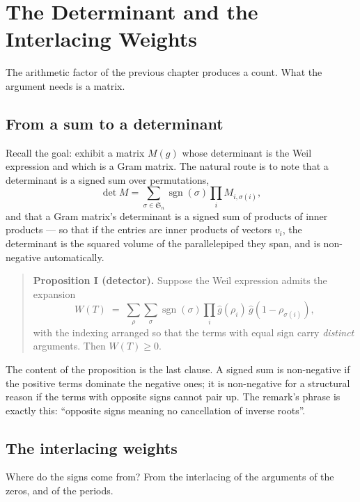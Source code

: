 
\chapter{The Determinant and the Interlacing Weights}
\label{ch:determinant}

The arithmetic factor of the previous chapter produces a count. What the
argument needs is a matrix.

\section{From a sum to a determinant}Recall the goal: exhibit a matrix $M(g)$ whose determinant is the Weil
expression and which is a Gram matrix. The natural route is to note that a
determinant is a signed sum over permutations,
\begin{equation}
\det M = \sum_{\sigma \in \mathfrak{S}_n} \operatorname{sgn}(\sigma)
\prod_{i} M_{i,\sigma(i)},
\end{equation}
and that a Gram matrix's determinant is a signed sum of products of inner
products --- so that if the entries are inner products of vectors $v_i$, the
determinant is the squared volume of the parallelepiped they span, and is
non-negative automatically.

\begin{quote}
\textbf{Proposition I (detector).} Suppose the Weil expression admits the
expansion
\[
W(T) \;=\; \sum_{\rho}\sum_{\sigma} \operatorname{sgn}(\sigma)
\prod_{i} \hat g(\rho_i)\,\hat g(1-\rho_{\sigma(i)}),
\]
with the indexing arranged so that the terms with equal sign carry
\emph{distinct} arguments. Then $W(T) \ge 0$.
\end{quote}

The content of the proposition is the last clause. A signed sum is
non-negative if the positive terms dominate the negative ones; it is
non-negative for a structural reason if the terms with opposite signs cannot
pair up. The remark's phrase is exactly this: ``opposite signs meaning no
cancellation of inverse roots''.

\section{The interlacing weights}Where do the signs come from? From the interlacing of the arguments of the
zeros, and of the periods.

